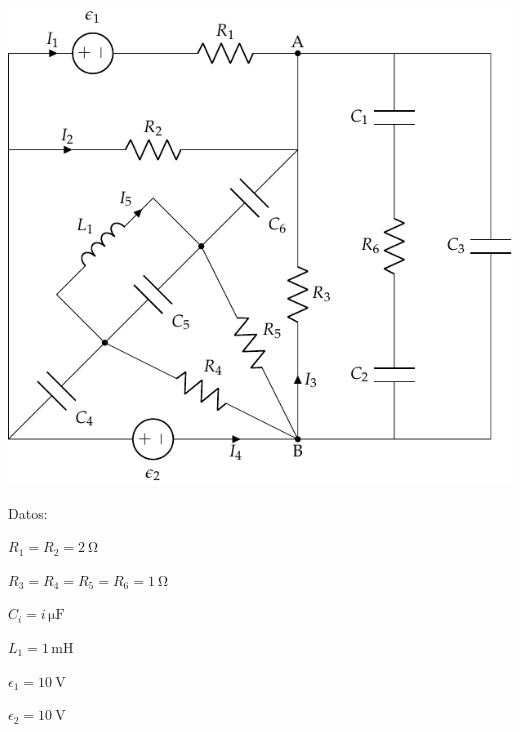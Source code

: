 \begin{enumerate}
    \begin{minipage}{0.65\linewidth}
      \includegraphics[scale=0.9]{../figs/BT1_ej14_enunciado.pdf}
    \end{minipage}
    \begin{minipage}{0.35\linewidth}
    
        \hspace{5mm}Datos:
    
        \vspace{2mm}    
        \hspace{5mm}$R_1 = R_2 = \qty{2}{\ohm}$
    
        \vspace{1mm}
        \hspace{5mm}$R_3 = R_4 = R_5 = R_6 = \qty{1}{\ohm}$
    
        \vspace{1mm}
        \hspace{5mm}$C_i = i\,\si{\micro\farad}$
    
        \vspace{1mm}
        \hspace{5mm}$L_1 = 1\,\si{\milli\henry}$
    
        \vspace{1mm}
        \hspace{5mm}$\epsilon_1 = \qty{10}{\volt}$
    
        \vspace{1mm}
        \hspace{5mm}$\epsilon_2 = \qty{10}{\volt}$
        

\end{minipage}
\end{enumerate}
